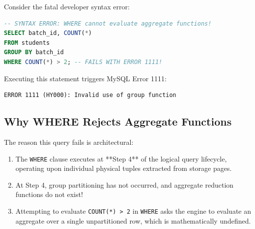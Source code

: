 \documentclass[10pt,twocolumn,letterpaper]{article}
\begin{document}
Consider the fatal developer syntax error:
\begin{lstlisting}[language=SQL]
-- SYNTAX ERROR: WHERE cannot evaluate aggregate functions!
SELECT batch_id, COUNT(*)
FROM students
GROUP BY batch_id
WHERE COUNT(*) > 2; -- FAILS WITH ERROR 1111!
\end{lstlisting}

Executing this statement triggers MySQL Error 1111:
\begin{lstlisting}[basicstyle=\ttfamily\scriptsize]
ERROR 1111 (HY000): Invalid use of group function
\end{lstlisting}

\subsection{Why WHERE Rejects Aggregate Functions}
The reason this query fails is architectural:
\begin{enumerate}
    \item The \texttt{WHERE} clause executes at **Step 4** of the logical query lifecycle, operating upon individual physical tuples extracted from storage pages.
    \item At Step 4, group partitioning has not occurred, and aggregate reduction functions do not exist!
    \item Attempting to evaluate \texttt{COUNT(*) > 2} in \texttt{WHERE} asks the engine to evaluate an aggregate over a single unpartitioned row, which is mathematically undefined.
\end{enumerate}
\end{document}
